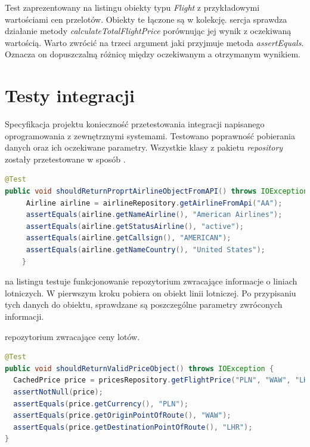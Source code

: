 \documentclass[12pt, twoside]{report}
\begin{document}
Test zaprezentowany na listingu   obiekty typu \textit{Flight} z przykładowymi wartościami cen przelotów. Obiekty te łączone są w kolekcję. sercja sprawdza  działanie metody \textit{calculateTotalFlightPrice} porównując jej wynik z oczekiwaną wartością. Warto zwrócić na trzeci argument jaki przyjmuje metoda \textit{assertEquals}. Oznacza on dopuszczalną różnicę między oczekiwanym a otrzymanym wynikiem. 
\section{Testy integracji}
Specyfikacja projektu  konieczność przetestowania integracji napisanego oprogramowania z zewnętrznymi systemami. Testowano poprawność pobierania danych oraz ich oczekiwane parametry. Wszystkie klasy z pakietu \textit{repository} zostały przetestowane w  sposób .
\begin{lstlisting}[language=java, caption=Przykładowy test integracyjny]
@Test
public void shouldReturnProprtAirlineObjectFromAPI() throws IOException {
     Airline airline = airlineRepository.getAirlineFromApi("AA");
     assertEquals(airline.getNameAirline(), "American Airlines");
     assertEquals(airline.getStatusAirline(), "active");
     assertEquals(airline.getCallsign(), "AMERICAN");
     assertEquals(airline.getNameCountry(), "United States");
    }
\end{lstlisting}
 na listingu  testuje funkcjonowanie repozytorium zwracające informacje o liniach lotniczych. W pierwszym kroku pobiera on obiekt linii lotniczej. Po przypisaniu tych danych do obiektu, sprawdzane są poszczególne parametry zwróconych informacji. 

 repozytorium zwracające ceny lotów.
\begin{lstlisting}[language=java, caption=Przykładowy test integracyjny]
@Test
public void shouldReturnValidPriceObject() throws IOException {
  CachedPrice price = pricesRepository.getFlightPrice("PLN", "WAW", "LHR", "20190128", "20190130");
  assertNotNull(price);
  assertEquals(price.getCurrency(), "PLN");
  assertEquals(price.getOriginPointOfRoute(), "WAW");
  assertEquals(price.getDestinationPointOfRoute(), "LHR");
}
\end{lstlisting}
\end{document}
